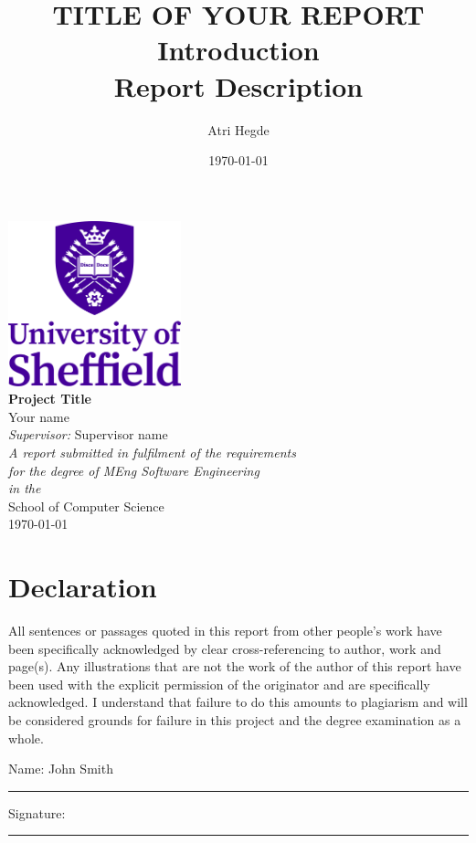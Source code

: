 \documentclass[a4paper,11pt]{report}
\author{Atri Hegde}
\date{\today}
\title{TITLE OF YOUR REPORT Introduction\\\medskip
\large Report Description}
\begin{document}
\begin{titlepage}
\begin{center}
\includegraphics[width=5cm]{assets/uos_logo.png}\\[2cm]
\linespread{1.2}\huge {\bfseries Project Title}\\[2cm]
\linespread{1}
{\Large Your name}\\[1cm]
{\large \emph{Supervisor:} Supervisor name}\\[1cm]
\large \emph{A report submitted in fulfilment of the requirements}\\ \emph{for the degree of MEng Software Engineering}\\[0.3cm] \textit{in the}\\[0.3cm] School of Computer Science\\[2cm]
\today
\end{center}
\end{titlepage}


\chapter*{\Large Declaration}

All sentences or passages quoted in this report from other people's work have been specifically acknowledged by clear cross-referencing to author, work and page(s). Any illustrations that are not the work of the author of this report have been used with the explicit permission of the originator and are specifically acknowledged. I understand that failure to do this amounts to plagiarism and will be considered grounds for failure in this project and the degree examination as a whole.

\noindent Name: John Smith \\[1mm]
\rule[1em]{25em}{0.5pt}

\noindent Signature:\\[1mm]
\rule[1em]{25em}{0.5pt}
\end{document}
